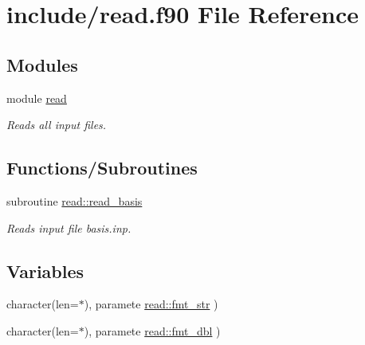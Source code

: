 \hypertarget{read_8f90}{
\section{include/read.f90 File Reference}
\label{read_8f90}
}
\subsection*{Modules}
\begin{DoxyCompactItemize}
\item 
module \hyperlink{namespaceread}{read}


\begin{DoxyCompactList}\small\item\em Reads all input files. \item\end{DoxyCompactList}\end{DoxyCompactItemize}
\subsection*{Functions/Subroutines}
\begin{DoxyCompactItemize}
\item 
subroutine \hyperlink{namespaceread_ad2d1fbc89fe20fbc19d9e322f246bb82}{read::read\_\-basis}
\begin{DoxyCompactList}\small\item\em Reads input file basis.inp. \item\end{DoxyCompactList}\end{DoxyCompactItemize}
\subsection*{Variables}
\begin{DoxyCompactItemize}
\item 
character(len=$\ast$), paramete \hyperlink{namespaceread_a58ca3da45698b8c19b442970b4e75ec6}{read::fmt\_\-str} )
\item 
character(len=$\ast$), paramete \hyperlink{namespaceread_ade3b381a293cace1ee9e385aa863e859}{read::fmt\_\-dbl} )
\end{DoxyCompactItemize}
